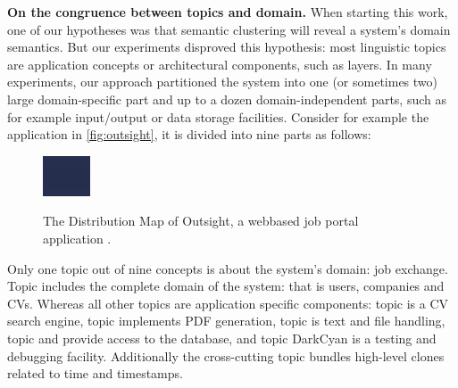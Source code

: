 \textbf{On the congruence between topics and domain.} When starting this work, one of our hypotheses was that semantic clustering will reveal a system's domain semantics. But our experiments disproved this hypothesis: most linguistic topics are application concepts or architectural components, such as layers. In many experiments, our approach partitioned the system into one (or sometimes two) large domain-specific part and up to a dozen domain-independent parts, such as for example input/output or data storage facilities. Consider for example the application in \autoref{fig:outsight}, it is divided into nine parts as follows:

\begin{figure}[h]
  \includegraphics[width=\linewidth]{outsightDistribution}\\
  \caption{The Distribution Map of Outsight, a webbased job portal application \cite{Kuhn06a}.}\label{fig:outsight}
\end{figure}

Only one topic out of nine concepts is about the system's domain: job exchange. Topic \red includes the complete domain of the system: that is users, companies and CVs. Whereas all other topics are application specific components: topic \blue is a CV search engine, topic \darkgreen implements PDF generation, topic \green is text and file handling, topic \cyan and \magenta provide access to the database, and topic DarkCyan is a testing and debugging facility. Additionally the cross-cutting topic \yellow bundles high-level clones related to time and timestamps.

